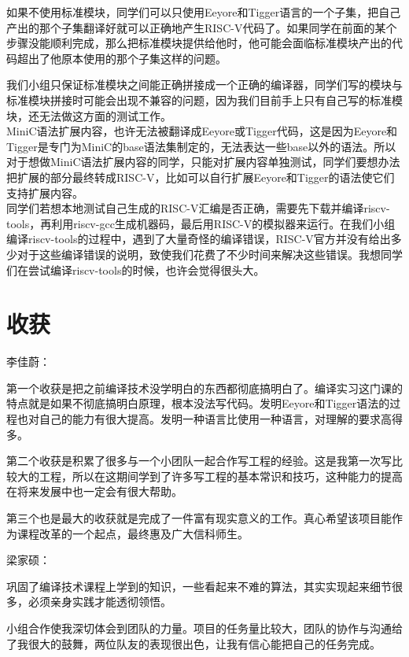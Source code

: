 \documentclass{ctexart}
\begin{document}
如果不使用标准模块，同学们可以只使用Eeyore和Tigger语言的一个子集，把自己产出的那个子集翻译好就可以正确地产生RISC-V代码了。如果同学在前面的某个步骤没能顺利完成，那么把标准模块提供给他时，他可能会面临标准模块产出的代码超出了他原本使用的那个子集这样的问题。

我们小组只保证标准模块之间能正确拼接成一个正确的编译器，同学们写的模块与标准模块拼接时可能会出现不兼容的问题，因为我们目前手上只有自己写的标准模块，还无法做这方面的测试工作。
\\

MiniC语法扩展内容，也许无法被翻译成Eeyore或Tigger代码，这是因为Eeyore和Tigger是专门为MiniC的base语法集制定的，无法表达一些base以外的语法。所以对于想做MiniC语法扩展内容的同学，只能对扩展内容单独测试，同学们要想办法把扩展的部分最终转成RISC-V，比如可以自行扩展Eeyore和Tigger的语法使它们支持扩展内容。
\\

同学们若想本地测试自己生成的RISC-V汇编是否正确，需要先下载并编译riscv-tools，再利用riscv-gcc生成机器码，最后用RISC-V的模拟器来运行。在我们小组编译riscv-tools的过程中，遇到了大量奇怪的编译错误，RISC-V官方并没有给出多少对于这些编译错误的说明，致使我们花费了不少时间来解决这些错误。我想同学们在尝试编译riscv-tools的时候，也许会觉得很头大。

\newpage
\section{收获}

\noindent 李佳蔚：

第一个收获是把之前编译技术没学明白的东西都彻底搞明白了。编译实习这门课的特点就是如果不彻底搞明白原理，根本没法写代码。发明Eeyore和Tigger语法的过程也对自己的能力有很大提高。发明一种语言比使用一种语言，对理解的要求高得多。

第二个收获是积累了很多与一个小团队一起合作写工程的经验。这是我第一次写比较大的工程，所以在这期间学到了许多写工程的基本常识和技巧，这种能力的提高在将来发展中也一定会有很大帮助。

第三个也是最大的收获就是完成了一件富有现实意义的工作。真心希望该项目能作为课程改革的一个起点，最终惠及广大信科师生。

\bigskip
\noindent 梁家硕：

巩固了编译技术课程上学到的知识，一些看起来不难的算法，其实实现起来细节很多，必须亲身实践才能透彻领悟。

小组合作使我深切体会到团队的力量。项目的任务量比较大，团队的协作与沟通给了我很大的鼓舞，两位队友的表现很出色，让我有信心能把自己的任务完成。
\end{document}
